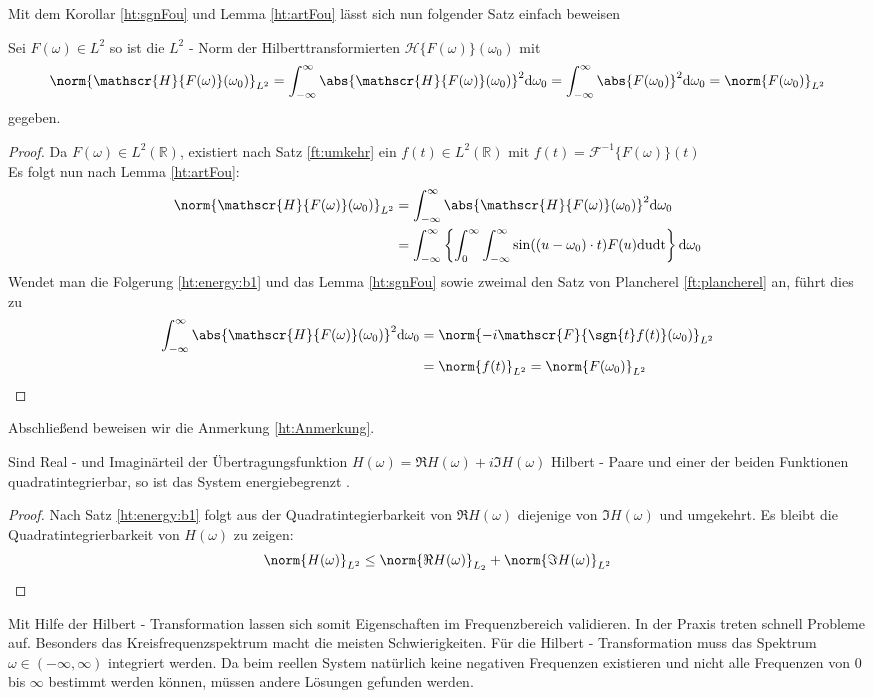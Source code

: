 Mit dem Korollar \ref{ht:sgnFou} und Lemma \ref{ht:artFou} lässt sich nun folgender Satz einfach beweisen 
\begin{satz}\label{ht:energy}
Sei $F(\omega) \in L^2$ so ist die $L^2$ - Norm der Hilberttransformierten $\mathscr{H}\{F(\omega)\}(\omega_0)$ mit
\begin{align}
	\norm{\mathscr{H}\{F(\omega)\}(\omega_0)}_{L^2} = \int_{-\infty}^{\infty} \abs{\mathscr{H}\{F(\omega)\}(\omega_0)}^2 \mathrm{d\omega_0} = \int_{-\infty}^{\infty} \abs{F(\omega_0)}^2 \mathrm{d\omega_0} = \norm{F(\omega_0)}_{L^2}
\end{align}
gegeben.
\begin{proof}
\label{ht:energy:b1} Da $F(\omega) \in L^2(\mathbb{R})$, existiert nach Satz \ref{ft:umkehr} ein $f(t) \in L^2(\mathbb{R})$ mit $f(t) = \mathscr{F}^{-1}\{F(\omega)\}(t)$ \\
Es folgt nun nach Lemma \ref{ht:artFou}: 
\begin{align}
	\norm{\mathscr{H}\{F(\omega)\}(\omega_0)}_{L^2} &= \int_{-\infty}^{\infty} \abs{\mathscr{H}\{F(\omega)\}(\omega_0)}^2 \mathrm{d\omega_0} \\
	&= \int_{-\infty}^{\infty}\left\{ \int_0^{\infty} \int_{-\infty}^{\infty} \sin((u-\omega_0) \cdot t) F(u) \mathrm{du} \mathrm{dt} \right\} \mathrm{d\omega_0}
\end{align}
Wendet man die Folgerung \ref{ht:energy:b1} und das Lemma \ref{ht:sgnFou} sowie zweimal den Satz von Plancherel \ref{ft:plancherel} an, führt dies zu
\begin{align}
	\int_{-\infty}^{\infty} \abs{\mathscr{H}\{F(\omega)\}(\omega_0)}^2 \mathrm{d\omega_0} &=  \norm{-i \mathscr{F}\{\sgn{t} f(t)\}(\omega_0) }_{L^2} \\
	&= \norm{f(t)}_{L^2} = \norm{F(\omega_0)}_{L^2}
\end{align}
\end{proof}
\end{satz}
Abschließend beweisen wir die Anmerkung \ref{ht:Anmerkung}.
\begin{satz}
Sind Real - und Imaginärteil der Übertragungsfunktion $H(\omega) = \Re{H(\omega)} + i \Im{H(\omega)}$ Hilbert - Paare und einer der beiden Funktionen quadratintegrierbar, so ist das System energiebegrenzt \cite[Seite 41]{Dotz2012}.
\begin{proof}
Nach Satz \ref{ht:energy:b1} folgt aus der Quadratintegierbarkeit von $\Re{H(\omega)}$ diejenige von $\Im{H(\omega)}$ und umgekehrt. Es bleibt die Quadratintegrierbarkeit von $H(\omega)$ zu zeigen:
\begin{align}
	\norm{H(\omega)}_{L^2} \leq \norm{\Re{H(\omega)}}_{L_2} + \norm{\Im{H(\omega)}}_{L^2}
\end{align}
\end{proof}
\end{satz}
Mit Hilfe der Hilbert - Transformation lassen sich somit Eigenschaften im Frequenzbereich validieren. In der Praxis treten schnell Probleme auf. Besonders das Kreisfrequenzspektrum macht die meisten Schwierigkeiten. Für die Hilbert - Transformation muss das Spektrum $\omega \in (-\infty, \infty)$ integriert werden. Da beim reellen System natürlich keine negativen Frequenzen existieren und nicht alle Frequenzen von $0$ bis $\infty$ bestimmt werden können, müssen andere Lösungen gefunden werden. 
